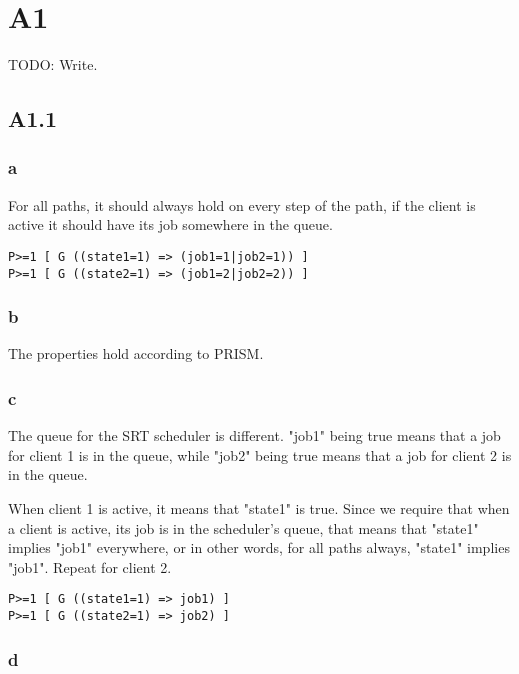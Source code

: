 
\section{A1}

TODO: Write.

\subsection{A1.1}

\subsubsection{a}

For all paths, it should always hold on every step of the path,
if the client is active it should have its job somewhere in the queue.

\begin{verbatim}
P>=1 [ G ((state1=1) => (job1=1|job2=1)) ]
P>=1 [ G ((state2=1) => (job1=2|job2=2)) ]
\end{verbatim}

\subsubsection{b}

The properties hold according to PRISM.

\subsubsection{c}

The queue for the SRT scheduler is different.
"job1" being true means that a job for
client 1 is in the queue,
while "job2" being true means that a job for
client 2 is in the queue.

When client 1 is active,
it means that "state1" is true.
Since we require that when a client is active,
its job is in the scheduler's queue,
that means that "state1" implies "job1"
everywhere, or in other words, for all paths
always, "state1" implies "job1".
Repeat for client 2.

\begin{verbatim}
P>=1 [ G ((state1=1) => job1) ]
P>=1 [ G ((state2=1) => job2) ]
\end{verbatim}

\subsubsection{d}

